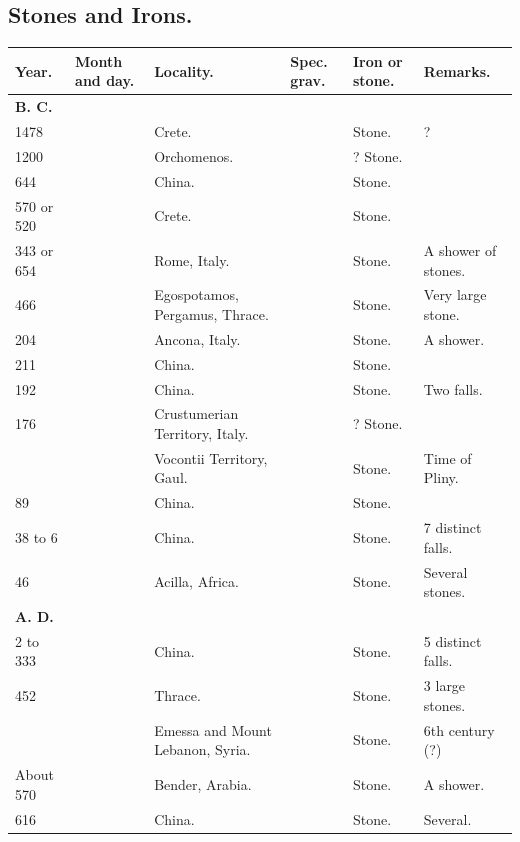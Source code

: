 \documentclass[a4paper, 12pt, oneside]{article}
\begin{document}
\subsection{Stones and Irons.}
\begin{center}
    \footnotesize
    \bfseries
    \begin{longtable}{|p{10mm}|p{15mm}|p{32mm}|p{13mm}|p{13mm}|p{26mm}|}
    \hline
        Year. & Month and day. & Locality. & Spec. grav. & Iron or stone. & Remarks. \\ \hline
        \textbf{B. C.} & ~ & ~ & ~ & ~ & ~ \\
        1478 & ~ & Crete. & ~ & Stone. & ? \\
        1200 & ~ & Orchomenos. & ~ & ? Stone. & ~ \\
        644 & ~ & China. & ~ & Stone. & ~ \\
        570 or 520 & ~ & Crete. & ~ & Stone. & ~ \\
        343 or 654 & ~ & Rome, Italy. & ~ & Stone. & A shower of stones. \\
        466 & ~ & Egospotamos, Pergamus, Thrace. & ~ & Stone. & Very large stone. \\
        204 & ~ & Ancona, Italy. & ~ & Stone. & A shower. \\
        211 & ~ & China. & ~ & Stone. & ~ \\
        192 & ~ & China. & ~ & Stone. & Two falls. \\
        176 & ~ & Crustumerian Territory, Italy. & ~ & ? Stone. & ~ \\
        ~ & ~ & Vocontii Territory, Gaul. & ~ & Stone. & Time of Pliny. \\
        89 & ~ & China. & ~ & Stone. & ~ \\
        38 to 6 & ~ & China. & ~ & Stone. & 7 distinct falls. \\
        46 & ~ & Acilla, Africa. & ~ & Stone. & Several stones. \\
        \textbf{A. D.} & ~ & ~ & ~ & ~ & ~ \\
        2 to 333 & ~ & China. & ~ & Stone. & 5 distinct falls. \\
        452 & ~ & Thrace. & ~ & Stone. & 3 large stones. \\
        ~ & ~ & Emessa and Mount Lebanon, Syria. & ~ & Stone. & 6th century (?) \\
        About 570 & ~ & Bender, Arabia. & ~ & Stone. & A shower. \\
        616 & ~ & China. & ~ & Stone. & Several. \\

\end{longtable}
\end{center}
\end{document}

